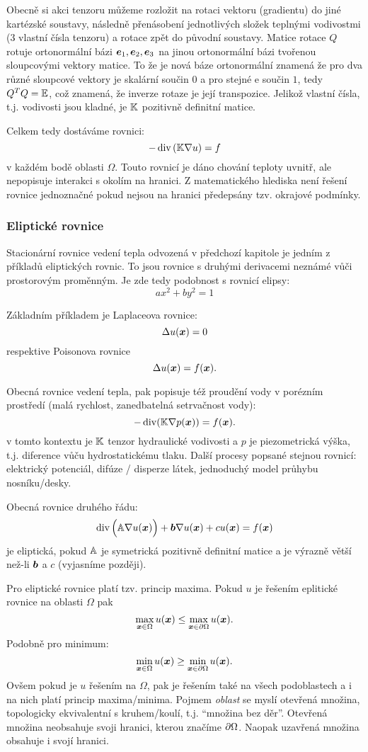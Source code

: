 Obecně si akci tenzoru můžeme rozložit na rotaci vektoru (gradientu) do jiné kartézské soustavy, 
následně přenásobení jednotlivých složek teplnými vodivostmi (3 vlastní čísla tenzoru)
a rotace zpět do původní soustavy. Matice rotace $Q$ rotuje ortonormální bázi 
$\mathbf{\boldsymbol{e}}_1, \mathbf{\boldsymbol{e}}_2, \mathbf{\boldsymbol{e}}_3$ na jinou ortonormální bázi tvořenou sloupcovými vektory matice.
To že je nová báze ortonormální znamená že pro dva různé sloupcové vektory je skalární 
součin $0$ a pro stejné e součin $1$, tedy  $Q^TQ = {\mathbb{E}}$, což znamená, že 
inverze rotaze je její transpozice. Jelikož vlastní čísla, t.j. vodivosti 
jsou kladné, je ${\mathbb{K}}$ pozitivně definitní matice.

Celkem tedy dostáváme rovnici:
\[
    - \operatorname{div}\left( {\mathbb{K}} \nabla u \right) = f  
\]
v každém bodě oblasti $\Omega$. Touto rovnicí je dáno chování teploty uvnitř, 
ale nepopisuje interakci s okolím na hranici. Z matematického hlediska není řešení 
rovnice jednoznačné pokud nejsou na hranici předepsány tzv. okrajové podmínky.



\subsubsection{Eliptické rovnice}
Stacionární rovnice vedení tepla odvozená v předchozí kapitole je jedním z příkladů 
eliptických rovnic. To jsou rovnice s druhými derivacemi neznámé vůči prostorovým proměnným.
Je zde tedy podobnost s rovnicí elipsy:
\[
    ax^2 + by^2 = 1
\]


Základním příkladem je Laplaceova rovnice:
\[
    \Delta u(\mathbf{\boldsymbol{x}}) = 0
\]
respektive Poisonova rovnice
\[
    \Delta u(\mathbf{\boldsymbol{x}}) = f(\mathbf{\boldsymbol{x}}).
\]

Obecná rovnice vedení tepla, pak popisuje též proudění vody v porézním prostředí 
(malá rychlost, zanedbatelná setrvačnost vody):
\[
   - \operatorname{div}( {\mathbb{K}} \nabla p(\mathbf{\boldsymbol{x}})) = f(\mathbf{\boldsymbol{x}}).
\]
v tomto kontextu je ${\mathbb{K}}$ tenzor hydraulické vodivosti a $p$ je piezometrická výška, t.j. 
diference vůču hydrostatickému tlaku. Další procesy popsané stejnou rovnicí: elektrický potenciál, 
difúze / disperze látek, jednoduchý model průhybu nosníku/desky.


Obecná rovnice druhého řádu:
\[
  \operatorname{div}\Big( {\mathbb{A}} \nabla u(\mathbf{\boldsymbol{x}})\Big) + \mathbf{\boldsymbol{b}} \nabla u(\mathbf{\boldsymbol{x}}) + c u(\mathbf{\boldsymbol{x}})= f(\mathbf{\boldsymbol{x}})
\]
je eliptická, pokud ${\mathbb{A}}$ je symetrická pozitivně definitní matice 
a je výrazně větší než-li $\mathbf{\boldsymbol{b}}$ a $c$ (vyjasníme později).

Pro eliptické rovnice platí tzv. princip maxima. 
Pokud $u$ je řešením eplitické rovnice na oblasti $\Omega$
pak 
\[
    \max_{\mathbf{\boldsymbol{x}} \in \Omega} u(\mathbf{\boldsymbol{x}}) \le \max_{\mathbf{\boldsymbol{x}} \in \partial \Omega}  u(\mathbf{\boldsymbol{x}}).
\]
Podobně pro minimum:
\[
    \min_{\mathbf{\boldsymbol{x}} \in \Omega} u(\mathbf{\boldsymbol{x}}) \ge \min_{\mathbf{\boldsymbol{x}} \in \partial \Omega}  u(\mathbf{\boldsymbol{x}}).
\]
Ovšem pokud je $u$ řešením na $\Omega$, pak je řešením také na všech 
podoblastech a i na nich platí princip maxima/minima. Pojmem {\it oblast}
se myslí otevřená množina, topologicky ekvivalentní s kruhem/koulí, t.j. ``množina bez děr''.
Otevřená množina neobsahuje svoji hranici, kterou značíme $\partial \Omega$. 
Naopak uzavřená množina obsahuje i svojí hranici. 


